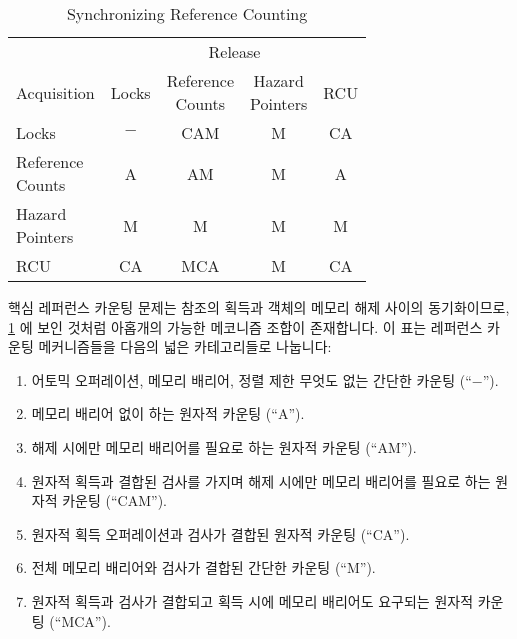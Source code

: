 \begin{table}[tb]
\renewcommand*{\arraystretch}{1.25}
\small
\centering
\begin{tabular}{lcccc}
	\toprule
	& \multicolumn{4}{c}{Release} \\
	\cmidrule(l){2-5}
	Acquisition	& Locks
				& \parbox[c]{.5in}{Reference\\Counts}
					& \parbox[c]{.5in}{Hazard\\Pointers}
						& RCU \\
	 \cmidrule(l){2-5}
	Locks		& $-$	& CAM	& M	& CA  \\
	\parbox[c][6ex]{.6in}{Reference\\Counts}
			& A	& AM    & M	& A   \\
	\parbox[c][6ex]{.6in}{Hazard\\Pointers}
			& M	& M	& M	& M   \\
	RCU		& CA	& MCA	& M	& CA  \\
	\bottomrule
\end{tabular}
\caption{Synchronizing Reference Counting}
\label{tab:together:Synchronizing Reference Counting}
\end{table}

핵심 레퍼런스 카운팅 문제는 참조의 획득과 객체의 메모리 해제 사이의
동기화이므로,
\cref{tab:together:Synchronizing Reference Counting}
에 보인 것처럼 아홉개의 가능한 메코니즘 조합이 존재합니다.
이 표는 레퍼런스 카운팅 메커니즘들을 다음의 넓은 카테고리들로 나눕니다:
\begin{enumerate}
\item	어토믹 오퍼레이션, 메모리 배리어, 정렬 제한 무엇도 없는 간단한 카운팅
	(``$-$'').
\item	메모리 배리어 없이 하는 원자적 카운팅 (``A'').
\item	해제 시에만 메모리 배리어를 필요로 하는 원자적 카운팅 (``AM'').
\item	원자적 획득과 결합된 검사를 가지며 해제 시에만 메모리 배리어를 필요로
	하는 원자적 카운팅 (``CAM'').
\item	원자적 획득 오퍼레이션과 검사가 결합된 원자적 카운팅 (``CA'').
\item	전체 메모리 배리어와 검사가 결합된 간단한 카운팅 (``M'').
\item	원자적 획득과 검사가 결합되고 획득 시에 메모리 배리어도 요구되는 원자적
	카운팅 (``MCA'').
\end{enumerate}

\iffalse

